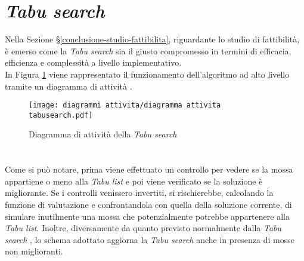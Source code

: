 \section{\textit{Tabu search}}
\label{sec:tabu-search}
\noindent Nella Sezione §\ref{conclusione-studio-fattibilita},
riguardante lo studio di fattibilità, è emerso come la \textit{Tabu search}
sia il giusto compromesso in termini di efficacia, efficienza
e complessità a livello implementativo.\\
In Figura \ref{diagramma-attivita-tabu-search}
viene rappresentato il funzionamento dell'algoritmo ad alto livello tramite un diagramma di attività \cite{siteH:rcardin}.
\vspace*{\fill}
\begin{figure}[!h] 
    \centering 
    \texttt{[image: diagrammi attivita/diagramma attivita tabusearch.pdf]} 
    \caption{Diagramma di attività della \textit{Tabu search}}
    \label{diagramma-attivita-tabu-search}
\end{figure}
\noindent \paragraph{}\hfill\\
Come si può notare, prima viene effettuato un controllo per vedere se la mossa
appartiene o meno alla \textit{Tabu list} e poi viene verificato se la soluzione è migliorante.
Se i controlli venissero invertiti, si rischierebbe, calcolando
la funzione di valutazione e confrontandola con quella della soluzione corrente,
di simulare inutilmente una mossa che potenzialmente potrebbe appartenere alla \textit{Tabu list}.
Inoltre, diversamente da quanto previsto normalmente dalla \textit{Tabu search} \cite{siteS:dispense-de-giovanni},
lo schema adottato aggiorna la \textit{Tabu search} anche in presenza di mosse non miglioranti.
\vspace*{\fill}

\newpage

